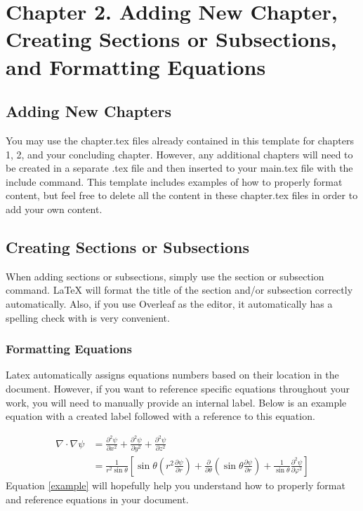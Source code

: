 \chapter{Chapter 2. Adding New Chapter, Creating Sections or Subsections, and Formatting Equations}

\section{Adding New Chapters}
You may use the chapter.tex files already contained in this template for chapters 1, 2, and your concluding chapter. However, any additional chapters will need to be created in a separate .tex file and then inserted to your main.tex file with the include command. This template includes examples of how to properly format content, but feel free to delete all the content in these chapter.tex files in order to add your own content. 

\section{Creating Sections or Subsections}
When adding sections or subsections, simply use the section or subsection command. LaTeX will format the title of the section and/or subsection correctly automatically. Also, if you use Overleaf as the editor, it automatically has a spelling check with is very convenient. 
\subsection{Formatting Equations}
Latex automatically assigns equations numbers based on their location in the document. However, if you want to reference specific equations throughout your work, you will need to manually provide an internal label. Below is an example equation with a created label followed with a reference to this equation.

\begin{equation}
  \label{example}
  \begin{split}
   \nabla \cdot \nabla \psi &= \frac{\partial^2 \psi}{\partial x^2} + \frac{\partial^2 \psi}{\partial y^2} + \frac{\partial^2 \psi}{\partial z^2} \\
   &= \frac{1}{r^2 \sin\theta} \left[ \sin\theta \left( r^2 \frac{\partial \psi}{\partial r} \right) + \frac{\partial}{\partial \theta} \left( \sin \theta  \frac{\partial \psi}{\partial r} \right) + \frac{1}{\sin \theta} \frac{\partial^2 \psi}{\partial \varphi^2}  \right] 
     \end{split}
\end{equation}
Equation \ref{example} will hopefully help you understand how to properly format and reference equations in your document.

